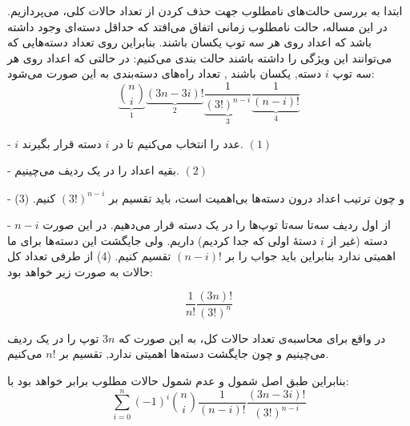     \p
    ابتدا به بررسی حالت‌های نامطلوب جهت حذف کردن از تعداد حالات کلی، می‌پردازیم. در این مساله، حالت نامطلوب زمانی اتفاق می‌افتد که حداقل دسته‌ای وجود داشته باشد که اعداد روی هر سه توپ یکسان باشند. بنابراین روی تعداد دسته‌هایی که می‌توانند این ویژگی را داشته باشند حالت بندی می‌کنیم:
\p
در حالتی که
    	اعداد روی هر سه توپ 
   $i$
    	 دسته, یکسان باشند , تعداد راه‌های دسته‌بندی به این صورت می‌شود:
    	$$\underbrace{{n  \choose i}}_1\underbrace{(3n - 3i)!}_2\underbrace{\frac{1}{(3!)^{n - i}}}_3 \underbrace{\frac{1}{(n - i)!}}_4$$
    	
    	- 
    	$i$
    	 عدد را انتخاب می‌کنیم تا در 
    	 $i$
    	  دسته قرار بگیرند.
    	$(1)$
    	
    	- بقیه اعداد را در یک ردیف می‌چینیم.
    	$(2)$
    	
    	- و چون ترتیب اعداد درون دسته‌ها بی‌اهمیت است، باید تقسیم بر $(3!)^{n-i}$ کنیم.
    	(3)
    	
    	- از اول ردیف سه‌تا سه‌تا توپ‌ها را در یک دسته قرار می‌دهیم. در این صورت $n - i$ دسته (غیر از 
    	$i$ 
    	دستهٔ اولی که جدا کردیم) داریم. ولی جایگشت این دسته‌ها برای ما اهمیتی ندارد بنابراین باید جواب را بر $(n-i)!$ تقسیم کنیم.
    	(4)
    \p
	از طرفی تعداد کل حالات به صورت زیر خواهد بود:
	
	$$\frac{1}{n!} \frac{(3n)!}{(3!)^n}$$
	
	در واقع برای محاسبه‌ی تعداد حالات کل، به این صورت که $3n$ توپ را در یک ردیف می‌چینیم و چون جایگشت دسته‌ها اهمیتی ندارد, تقسیم بر $n!$ می‌کنیم.
	
    \p
	بنابراین طبق اصل شمول و عدم شمول حالات مطلوب برابر خواهد بود با:
	$$\sum\limits_{i = 0}^n (-1)^i {n \choose i} \frac{1}{(n - i)!} \frac{(3n - 3i)!}{(3!)^{n - i}}$$

